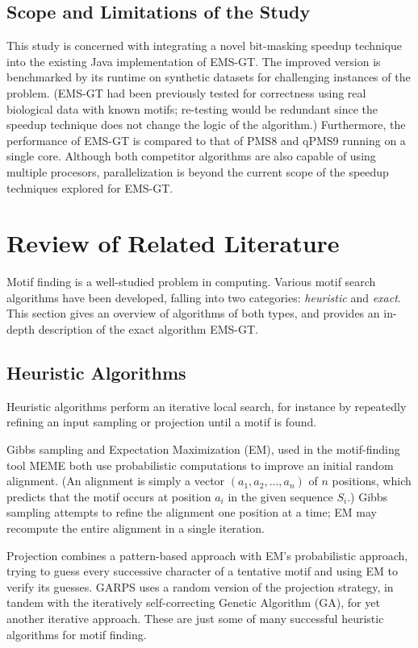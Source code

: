 \documentclass[oneside,12pt]{DISCSthesis}
\begin{document}
	\section{Scope and Limitations of the Study}
		This study is concerned with integrating a novel bit-masking speedup technique into the existing Java implementation of EMS-GT. The improved version is benchmarked by its runtime on synthetic datasets for challenging instances of the problem. (EMS-GT had been previously tested for correctness using real biological data with known motifs; re-testing would be redundant since the speedup technique does not change the logic of the algorithm.)	
		Furthermore, the performance of EMS-GT is compared to that of PMS8 and qPMS9 running on a single core. Although both competitor algorithms are also capable of using multiple procesors, parallelization is beyond the current scope of the speedup techniques explored for EMS-GT.

\chapter{Review of Related Literature}
	Motif finding is a well-studied problem in computing. Various motif search algorithms have been developed,
	falling into two categories: \emph{heuristic} and \emph{exact}. This section gives an overview of algorithms
	of both types, and provides an in-depth description of the exact algorithm EMS-GT.
	
	\section{Heuristic Algorithms}
		Heuristic algorithms perform an iterative local search, for instance by repeatedly refining an input sampling or projection until 
		a motif is found. 

		Gibbs sampling \cite{lawrence1993detecting} and Expectation Maximization (EM), used in the motif-finding tool MEME \cite{lawrence1990expectation,bailey1995unsupervised} both use probabilistic computations to improve an initial random alignment. (An alignment is simply a vector $(a_{1}, a_{2},...,a_{n})$ of $n$ positions, which predicts that the motif occurs at position $a_{i}$ in the given sequence $S_{i}$.) Gibbs sampling attempts to refine the alignment one position at a time; %
		EM may recompute the entire alignment in a single iteration. 

		Projection \cite{blanchette2002discovery} combines a pattern-based approach with EM's probabilistic approach, trying to guess every successive character of a tentative motif and using EM to verify its guesses. GARPS \cite{huo2009combining} uses a random version of the projection strategy, in tandem with the iteratively self-correcting Genetic Algorithm (GA), for yet another iterative approach. These are just some of many successful heuristic algorithms for motif finding.
\end{document}
